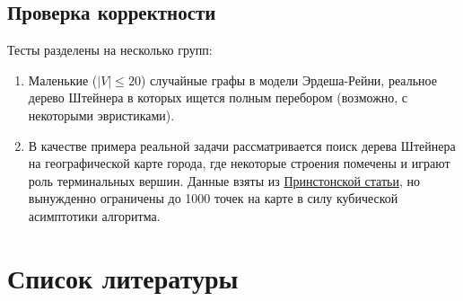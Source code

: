 \documentclass[11pt,a4paper]{report}
\def\le{\leqslant}
\theoremstyle{definition}
\theoremstyle{definition}
\theoremstyle{definition}
\begin{document}
	\subsection{Проверка корректности}
		Тесты разделены на несколько групп:
		\begin{enumerate}
			\item Маленькие ($|V| \le 20$) случайные графы в модели Эрдеша-Рейни, реальное дерево Штейнера в которых ищется полным перебором (возможно, с некоторыми эвристиками).
			\item В качестве примера реальной задачи рассматривается поиск дерева Штейнера на географической карте города, где некоторые строения помечены и играют роль терминальных вершин. Данные взяты из \href{https://homepage.univie.ac.at/ivana.ljubic/research/STP/}{Принстонской статьи}, но вынужденно ограничены до 1000 точек на карте в силу кубической асимптотики алгоритма.
		\end{enumerate}
	\section{Список литературы}
\end{document}

